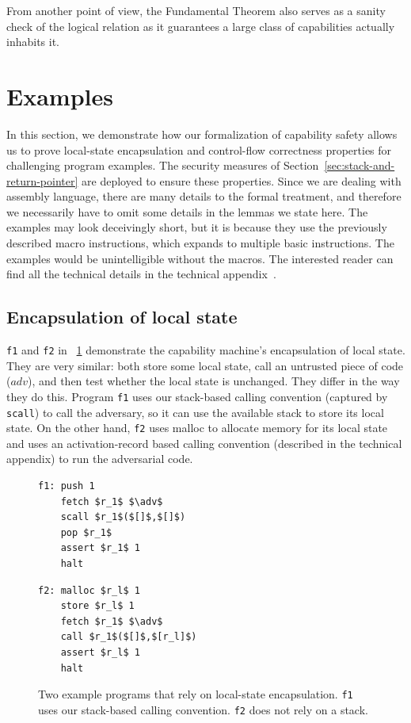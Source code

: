 \documentclass[acmsmall,review]{acmart}\settopmatter{printfolios=true}
\newcommand{\var}[1]{\mathit{#1}}
\newcommand{\adv}{\var{adv}}
\begin{document}
From another point of view, the Fundamental Theorem also serves as a sanity
check of the logical relation as it guarantees a large class of
capabilities actually inhabits it.

\section{Examples}
\label{sec:examples}
In this section, we demonstrate how our formalization of capability
safety allows us to prove local-state encapsulation and control-flow
correctness properties for challenging program examples. The security
measures of Section~\ref{sec:stack-and-return-pointer} are deployed to
ensure these properties. Since we are dealing with assembly language,
there are many details to the formal treatment, and therefore we
necessarily have to omit some details in the lemmas we state here. The
examples may look deceivingly short, but it is because they use the
previously described macro instructions, which expands to multiple
basic instructions. The examples would be unintelligible without the
macros. The interested reader can find all the technical details in
the technical appendix~\citep{technical_appendix}.

\subsection{Encapsulation of local state}
\texttt{\footnotesize{f1}} and \texttt{\footnotesize{f2}} in
\figurename~\ref{fig:prog-f1-and-f2} demonstrate the capability
machine's encapsulation of local state. They are very similar: both
store some local state, call an untrusted piece of code ($\adv$), and
then test whether the local state is unchanged. They differ in the way
they do this. Program \texttt{\footnotesize{f1}} uses our stack-based
calling convention (captured by \texttt{\footnotesize{scall}}) to call
the adversary, so it can use the available stack to store its local
state.  On the other hand, \texttt{\footnotesize{f2}} uses malloc to
allocate memory for its local state and uses an activation-record
based calling convention (described in the technical appendix) to run
the adversarial code.

\begin{figure}[t]
  \centering

  \begin{minipage}[t]{4.1cm}
  \begin{lstlisting}
f1: push 1
    fetch $r_1$ $\adv$
    scall $r_1$($[]$,$[]$)
    pop $r_1$
    assert $r_1$ 1
    halt
  \end{lstlisting}
  \end{minipage}
  \begin{minipage}[t]{4.1cm}
  \begin{lstlisting}
f2: malloc $r_l$ 1
    store $r_l$ 1
    fetch $r_1$ $\adv$
    call $r_1$($[]$,$[r_l]$)
    assert $r_l$ 1
    halt
  \end{lstlisting}
  \end{minipage}
  \caption{Two example programs that rely on local-state encapsulation. \texttt{f1} uses our stack-based calling convention. \texttt{f2} does not rely on a stack.}
  \label{fig:prog-f1-and-f2}
\end{figure}
\end{document}
